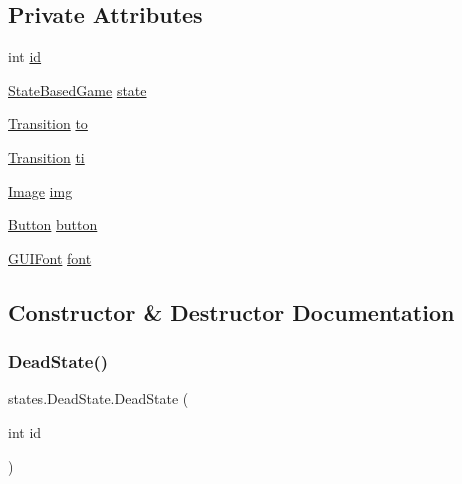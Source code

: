 \subsection*{Private Attributes}
\begin{DoxyCompactItemize}
\item 
int \mbox{\hyperlink{classstates_1_1_dead_state_af4562c02a3bcac59678cfd1d540add79}{id}}
\item 
\mbox{\hyperlink{classorg_1_1newdawn_1_1slick_1_1state_1_1_state_based_game}{State\+Based\+Game}} \mbox{\hyperlink{classstates_1_1_dead_state_a19351574a15993ba884dba664b03cc1e}{state}}
\item 
\mbox{\hyperlink{interfaceorg_1_1newdawn_1_1slick_1_1state_1_1transition_1_1_transition}{Transition}} \mbox{\hyperlink{classstates_1_1_dead_state_abd0a826acb872d9a3ed0d92aa2f82a22}{to}}
\item 
\mbox{\hyperlink{interfaceorg_1_1newdawn_1_1slick_1_1state_1_1transition_1_1_transition}{Transition}} \mbox{\hyperlink{classstates_1_1_dead_state_ad765e614e0b0d53af3270e05a44e7a0d}{ti}}
\item 
\mbox{\hyperlink{classorg_1_1newdawn_1_1slick_1_1_image}{Image}} \mbox{\hyperlink{classstates_1_1_dead_state_aeb62b1b52d9fcfed82d906d277a3bc62}{img}}
\item 
\mbox{\hyperlink{classgui_1_1_button}{Button}} \mbox{\hyperlink{classstates_1_1_dead_state_a79a5bdb7e1e66fa98c2e7bc674c00cb0}{button}}
\item 
\mbox{\hyperlink{classgui_1_1_g_u_i_font}{G\+U\+I\+Font}} \mbox{\hyperlink{classstates_1_1_dead_state_afe1e79808988fbe6704a858bd569f0cc}{font}}
\end{DoxyCompactItemize}


\subsection{Constructor \& Destructor Documentation}
\mbox{\label{classstates_1_1_dead_state_ac19c502769593a77e120afe70c67014f}} 
\subsubsection{\texorpdfstring{Dead\+State()}{DeadState()}}
{\footnotesize\ttfamily states.\+Dead\+State.\+Dead\+State (\begin{DoxyParamCaption}\item[{int}]{id }\end{DoxyParamCaption})\hspace{0.3cm}{\ttfamily [inline]}}


